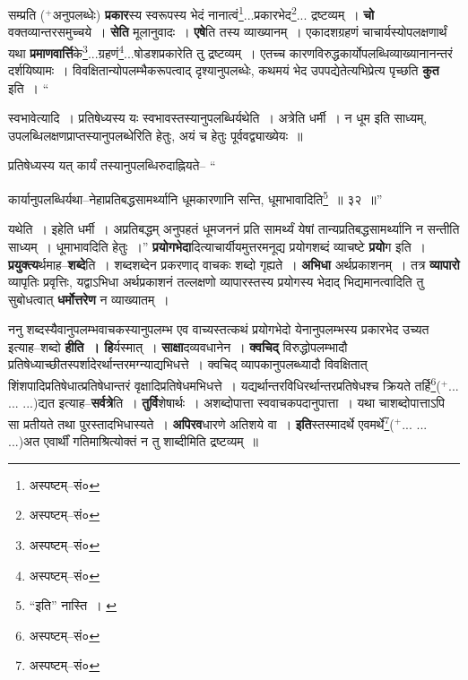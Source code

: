 \documentclass[article,12pt,a4paper]{memoir}
\newcommand{\add}[1]{($^{+}$#1)}
\begin{document}
	  \pstart सम्प्रति \add{अनुपलब्धेः} \textbf{प्रकार}स्य स्वरूपस्य भेदं नानात्वं\footnote{अस्पष्टम्--सं०}\-...प्रकारभेद\footnote{अस्पष्टम्--सं०}\-... द्रष्टव्यम् । \textbf{चो} वक्तव्यान्तरसमुच्चये । \textbf{सेति} मूलानुवादः । \textbf{एषे}ति तस्य व्याख्यानम् । एकादशग्रहणं चाचार्यस्योपलक्षणार्थं यथा \textbf{प्रमाणवार्त्ति}के\footnote{अस्पष्टम्--सं०}\-...ग्रहणं\footnote{अस्पष्टम्--सं०}\-...षोडशप्रकारेति तु द्रष्टव्यम् । एतच्च कारणविरुद्धकार्योपलब्धिव्याख्यानानन्तरं दर्शयिष्यामः । विवक्षितान्योपलम्भैकरूपत्वाद् दृश्यानुपलब्धेः, कथमयं भेद उपपद्येतेत्यभिप्रेत्य पृच्छति \textbf{कुत} इति ।  \leavevmode{} “
	  
	स्वभावेत्यादि । प्रतिषेध्यस्य यः स्वभावस्तस्यानुपलब्धिर्यथेति । अत्रेति धर्मी । न धूम इति साध्यम्, उपलब्धिलक्षणप्राप्तस्यानुपलब्धेरिति हेतुः, अयं च हेतुः पूर्ववद्व्याख्येयः ॥ 
	  
	प्रतिषेध्यस्य यत् कार्यं तस्यानुपलब्धिरुदाह्नियते-- “
	  
	कार्यानुपलब्धिर्यथा--नेहाप्रतिबद्धसामर्थ्यानि धूमकारणानि सन्ति, धूमाभावादिति\footnote{“इति” नास्ति । \cite{dp-msB} \cite{dp-edP} \cite{dp-edH} \cite{dp-edE} \cite{dp-edN}} ॥ ३२ ॥” 
	  
	यथेति । इहेति धर्मी । अप्रतिबद्धम् अनुपहतं धूमजननं प्रति सामर्थ्यं येषां तान्यप्रतिबद्धसामर्थ्यानि न सन्तीति साध्यम् । धूमाभावदिति हेतुः ।” \textbf{प्रयोगभेदा}दित्याचार्यीयमुत्तरमनूद्य प्रयोगशब्दं व्याचष्टे \textbf{प्रयो}ग इति । \textbf{प्रयुक्त्य}र्थमाह--\textbf{शब्दे}ति । शब्दशब्देन प्रकरणाद् वाचकः शब्दो गृह्यते । \textbf{अभिधा} अर्थप्रकाशनम् । तत्र \textbf{व्यापारो} व्यापृतिः प्रवृत्तिः, यद्वाऽभिधा अर्थप्रकाशनं तल्लक्षणो व्यापारस्तस्य प्रयोगस्य भेदाद् भिद्यमानत्वादिति तु सुबोधत्वात् \textbf{धर्मोत्तरेण} न व्याख्यातम् ।
	\pend
      

	  \pstart ननु शब्दस्यैवानुपलम्भवाचकस्यानुपलम्भ एव वाच्यस्तत्कथं प्रयोगभेदो येनानुपलम्भस्य प्रकारभेद उच्यत इत्याह--शब्दो \textbf{हीति । हि}र्यस्मात् । \textbf{साक्षा}दव्यवधानेन । \textbf{क्वचिद्} विरुद्धोपलम्भादौ प्रतिषेध्याच्छीतस्पर्शादेरर्थान्तरमग्न्याद्यभिधत्ते । क्वचिद् व्यापकानुपलब्ध्यादौ विवक्षितात् शिंशपादिप्रतिषेधात्प्रतिषेधान्तरं वृक्षादिप्रतिषेधमभिधत्ते । यद्यर्थान्तरविधिरर्थान्तरप्रतिषेधश्च क्रियते तर्हि\footnote{अस्पष्टम्--सं०}\add{... ... ...}द्यत इत्याह--\textbf{सर्वत्रे}ति । \textbf{तुर्वि}शेषार्थः । अशब्दोपात्ता स्ववाचकपदानुपात्ता । यथा चाशब्दोपात्ताऽपि सा प्रतीयते तथा पुरस्तादभिधास्यते । \textbf{अपिरव}धारणे अतिशये वा । \textbf{इति}स्तस्मादर्थे एवमर्थे\footnote{अस्पष्टम्--सं०}\add{... ... ...}अत एवार्थीं गतिमाश्रित्योक्तं न तु शाब्दीमिति द्रष्टव्यम् ॥
	\pend
      
\end{document}
